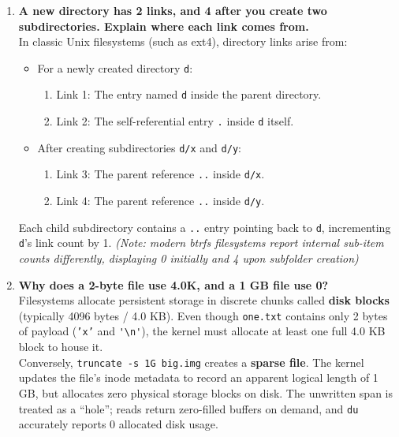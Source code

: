\documentclass{labreport}
\begin{document}
\begin{enumerate}[leftmargin=*]
    \item \textbf{A new directory has 2 links, and 4 after you create two subdirectories. Explain where each link comes from.}\\[0.2em]
    In classic Unix filesystems (such as ext4), directory links arise from:
    \begin{itemize}[noitemsep, topsep=2pt]
        \item For a newly created directory \texttt{d}:
        \begin{enumerate}[label=(\alph*), noitemsep]
            \item Link 1: The entry named \texttt{d} inside the parent directory.
            \item Link 2: The self-referential entry \texttt{.} inside \texttt{d} itself.
        \end{enumerate}
        \item After creating subdirectories \texttt{d/x} and \texttt{d/y}:
        \begin{enumerate}[label=(\alph*), resume, noitemsep]
            \item Link 3: The parent reference \texttt{..} inside \texttt{d/x}.
            \item Link 4: The parent reference \texttt{..} inside \texttt{d/y}.
        \end{enumerate}
    \end{itemize}
    Each child subdirectory contains a \texttt{..} entry pointing back to \texttt{d}, incrementing \texttt{d}'s link count by 1. \textit{(Note: modern btrfs filesystems report internal sub-item counts differently, displaying 0 initially and 4 upon subfolder creation)}

    \item \textbf{Why does a 2-byte file use 4.0K, and a 1 GB file use 0?}\\[0.2em]
    Filesystems allocate persistent storage in discrete chunks called \textbf{disk blocks} (typically 4096 bytes / 4.0 KB). Even though \texttt{one.txt} contains only 2 bytes of payload (\texttt{'x'} and \verb|'\n'|), the kernel must allocate at least one full 4.0 KB block to house it.\\
    Conversely, \texttt{truncate -s 1G big.img} creates a \textbf{sparse file}. The kernel updates the file's inode metadata to record an apparent logical length of 1 GB, but allocates zero physical storage blocks on disk. The unwritten span is treated as a ``hole''; reads return zero-filled buffers on demand, and \texttt{du} accurately reports 0 allocated disk usage.
\end{enumerate}
\end{document}
